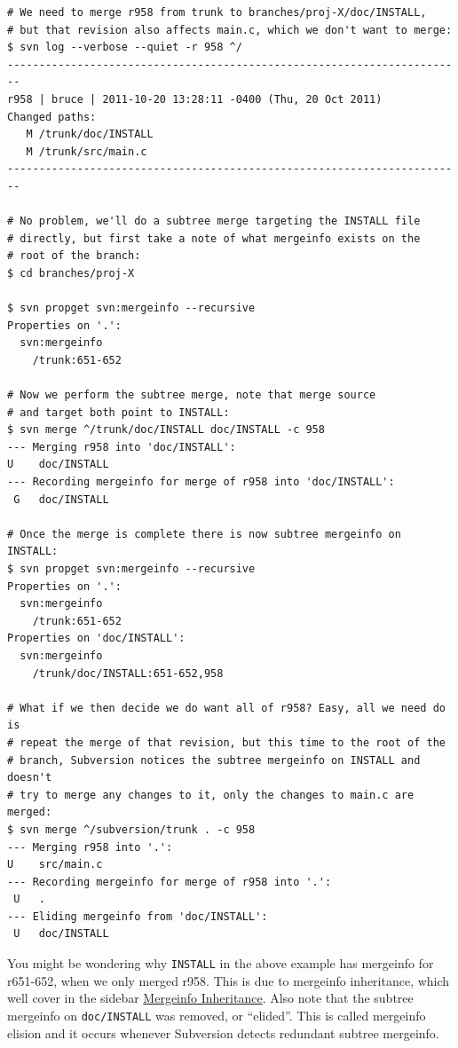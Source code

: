 \begin{verbatim}
# We need to merge r958 from trunk to branches/proj-X/doc/INSTALL,
# but that revision also affects main.c, which we don't want to merge:
$ svn log --verbose --quiet -r 958 ^/
------------------------------------------------------------------------
r958 | bruce | 2011-10-20 13:28:11 -0400 (Thu, 20 Oct 2011)
Changed paths:
   M /trunk/doc/INSTALL
   M /trunk/src/main.c
------------------------------------------------------------------------

# No problem, we'll do a subtree merge targeting the INSTALL file
# directly, but first take a note of what mergeinfo exists on the
# root of the branch:
$ cd branches/proj-X

$ svn propget svn:mergeinfo --recursive
Properties on '.':
  svn:mergeinfo
    /trunk:651-652

# Now we perform the subtree merge, note that merge source
# and target both point to INSTALL:
$ svn merge ^/trunk/doc/INSTALL doc/INSTALL -c 958
--- Merging r958 into 'doc/INSTALL':
U    doc/INSTALL
--- Recording mergeinfo for merge of r958 into 'doc/INSTALL':
 G   doc/INSTALL

# Once the merge is complete there is now subtree mergeinfo on INSTALL:
$ svn propget svn:mergeinfo --recursive
Properties on '.':
  svn:mergeinfo
    /trunk:651-652
Properties on 'doc/INSTALL':
  svn:mergeinfo
    /trunk/doc/INSTALL:651-652,958

# What if we then decide we do want all of r958? Easy, all we need do is
# repeat the merge of that revision, but this time to the root of the
# branch, Subversion notices the subtree mergeinfo on INSTALL and doesn't
# try to merge any changes to it, only the changes to main.c are merged:
$ svn merge ^/subversion/trunk . -c 958
--- Merging r958 into '.':
U    src/main.c
--- Recording mergeinfo for merge of r958 into '.':
 U   .
--- Eliding mergeinfo from 'doc/INSTALL':
 U   doc/INSTALL
\end{verbatim}

You might be wondering why \texttt{INSTALL} in the above example has
mergeinfo for r651-652, when we only merged r958. This is due to
mergeinfo inheritance, which we\textquotesingle ll cover in the sidebar
\hyperref[svn.branchmerge.basicmerging.mergeinfo.inheritance]{Mergeinfo
Inheritance}. Also note that the subtree mergeinfo on
\texttt{doc/INSTALL} was removed, or ``elided''. This is called
mergeinfo elision and it occurs whenever Subversion detects redundant
subtree mergeinfo.

